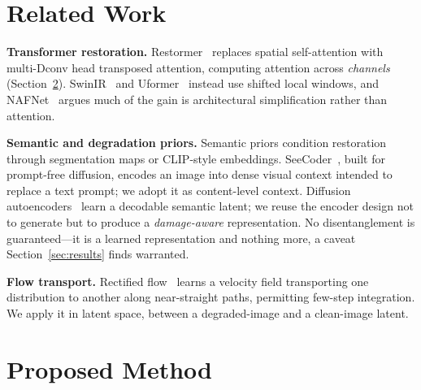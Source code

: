 \documentclass[conference]{IEEEtran}
\newcommand{\bs}[1]{\textbf{#1}}
\begin{document}
\section{Related Work}

\bs{Transformer restoration.} Restormer~\cite{restormer} replaces spatial
self-attention with multi-Dconv head transposed attention, computing attention
across \emph{channels} (Section~\ref{sec:method}). SwinIR~\cite{swinir} and
Uformer~\cite{uformer} instead use shifted local windows, and
NAFNet~\cite{nafnet} argues much of the gain is architectural simplification
rather than attention.

\bs{Semantic and degradation priors.} Semantic priors condition restoration
through segmentation maps or CLIP-style embeddings. SeeCoder~\cite{seecoder},
built for prompt-free diffusion, encodes an image into dense visual context
intended to replace a text prompt; we adopt it as content-level context.
Diffusion autoencoders~\cite{diffae} learn a decodable semantic latent; we
reuse the encoder design not to generate but to produce a \emph{damage-aware}
representation. No disentanglement is guaranteed---it is a learned
representation and nothing more, a caveat Section~\ref{sec:results} finds
warranted.

\bs{Flow transport.} Rectified flow~\cite{rectifiedflow} learns a velocity
field transporting one distribution to another along near-straight paths,
permitting few-step integration. We apply it in latent space, between a
degraded-image and a clean-image latent.

\section{Proposed Method}
\label{sec:method}
\end{document}
